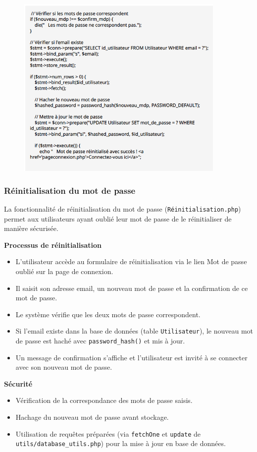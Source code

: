 \documentclass[a4paper,12pt]{article}
\begin{document}
\begin{figure}[H]
  \centering
  \includegraphics[width=0.9\textwidth]{capture4.png}
\end{figure}
\subsubsection{Réinitialisation du mot de passe}
La fonctionnalité de réinitialisation du mot de passe (\texttt{Réinitialisation.php}) permet aux utilisateurs ayant oublié leur mot de passe de le réinitialiser de manière sécurisée.

\textbf{Processus de réinitialisation}
\begin{itemize}
  \item L'utilisateur accède au formulaire de réinitialisation via le lien \og Mot de passe oublié \fg{} sur la page de connexion.
  \item Il saisit son adresse email, un nouveau mot de passe et la confirmation de ce mot de passe.
  \item Le système vérifie que les deux mots de passe correspondent.
  \item Si l'email existe dans la base de données (table \texttt{Utilisateur}), le nouveau mot de passe est haché avec \texttt{password\_hash()} et mis à jour.
  \item Un message de confirmation s'affiche et l'utilisateur est invité à se connecter avec son nouveau mot de passe.
\end{itemize}

\textbf{Sécurité}
\begin{itemize}
  \item Vérification de la correspondance des mots de passe saisis.
  \item Hachage du nouveau mot de passe avant stockage.
  \item Utilisation de requêtes préparées (via \texttt{fetchOne} et \texttt{update} de \texttt{utils/database\_utils.php}) pour la mise à jour en base de données.
\end{itemize}
\end{document}
